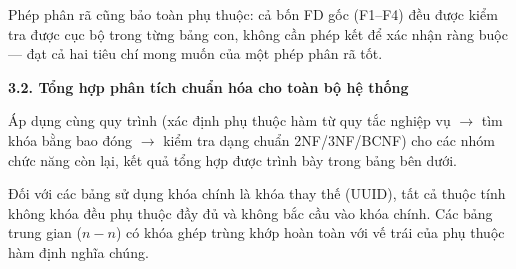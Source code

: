 Phép phân rã cũng bảo toàn phụ thuộc: cả bốn FD gốc (F1–F4) đều được kiểm tra được cục bộ trong từng bảng con, không cần phép kết để xác nhận ràng buộc — đạt cả hai tiêu chí mong muốn của một phép phân rã tốt.

\vspace{1.8em}
{}
{\Large\bfseries 3.2. Tổng hợp phân tích chuẩn hóa cho toàn bộ hệ thống}\par\vspace{0.8em}

Áp dụng cùng quy trình (xác định phụ thuộc hàm từ quy tắc nghiệp vụ $\rightarrow$ tìm khóa bằng bao đóng $\rightarrow$ kiểm tra dạng chuẩn 2NF/3NF/BCNF) cho các nhóm chức năng còn lại, kết quả tổng hợp được trình bày trong bảng bên dưới.

Đối với các bảng sử dụng khóa chính là khóa thay thế (UUID), tất cả thuộc tính không khóa đều phụ thuộc đầy đủ và không bắc cầu vào khóa chính. Các bảng trung gian ($n-n$) có khóa ghép trùng khớp hoàn toàn với vế trái của phụ thuộc hàm định nghĩa chúng.

